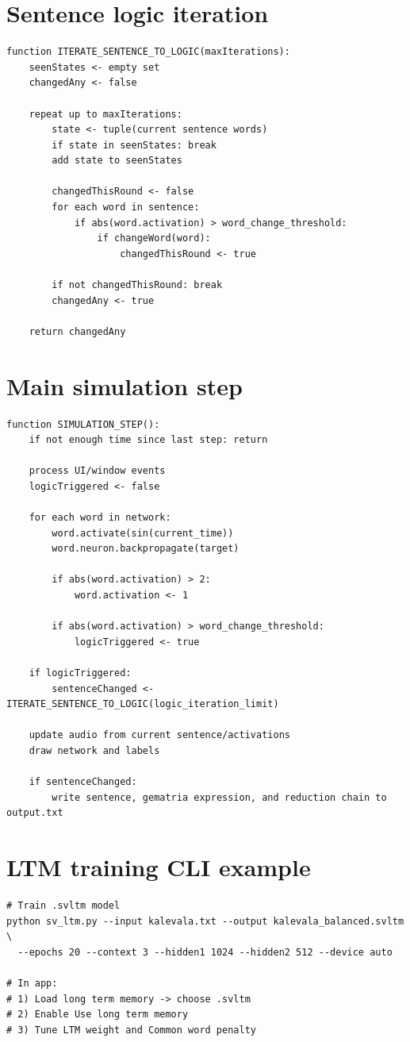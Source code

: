 \documentclass[11pt,a4paper]{report}
\begin{document}
\section{Sentence logic iteration}
\begin{lstlisting}[style=pseudocode]
function ITERATE_SENTENCE_TO_LOGIC(maxIterations):
    seenStates <- empty set
    changedAny <- false

    repeat up to maxIterations:
        state <- tuple(current sentence words)
        if state in seenStates: break
        add state to seenStates

        changedThisRound <- false
        for each word in sentence:
            if abs(word.activation) > word_change_threshold:
                if changeWord(word):
                    changedThisRound <- true

        if not changedThisRound: break
        changedAny <- true

    return changedAny
\end{lstlisting}

\section{Main simulation step}
\begin{lstlisting}[style=pseudocode]
function SIMULATION_STEP():
    if not enough time since last step: return

    process UI/window events
    logicTriggered <- false

    for each word in network:
        word.activate(sin(current_time))
        word.neuron.backpropagate(target)

        if abs(word.activation) > 2:
            word.activation <- 1

        if abs(word.activation) > word_change_threshold:
            logicTriggered <- true

    if logicTriggered:
        sentenceChanged <- ITERATE_SENTENCE_TO_LOGIC(logic_iteration_limit)

    update audio from current sentence/activations
    draw network and labels

    if sentenceChanged:
        write sentence, gematria expression, and reduction chain to output.txt
\end{lstlisting}

\section{LTM training CLI example}
\begin{lstlisting}[style=pseudocode]
# Train .svltm model
python sv_ltm.py --input kalevala.txt --output kalevala_balanced.svltm \
  --epochs 20 --context 3 --hidden1 1024 --hidden2 512 --device auto

# In app:
# 1) Load long term memory -> choose .svltm
# 2) Enable Use long term memory
# 3) Tune LTM weight and Common word penalty
\end{lstlisting}
\end{document}
